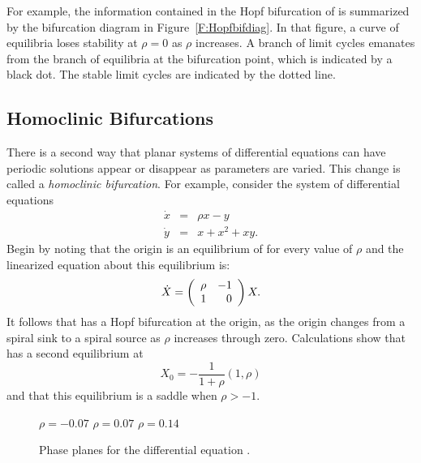 For example, the information contained in the Hopf bifurcation of 
 is summarized by the bifurcation diagram in 
Figure~\ref{F:Hopfbifdiag}.
In that figure, a curve of equilibria  
loses stability at $\rho=0$ as $\rho$ increases.  A branch of limit 
cycles emanates from the
branch of equilibria at the bifurcation point, which is indicated by a 
black dot.  The stable limit cycles are indicated by the dotted line.



\subsection*{Homoclinic Bifurcations}

There is a second way that planar systems of differential equations 
can have periodic solutions appear or disappear as parameters are varied.  
This  change is called a {\em homoclinic bifurcation\/}.  For example,
consider the system of differential equations
\begin{equation*}  \label{E:homobif}
\begin{array}{rcl} 
\dot{x} & = & \rho x - y \\
\dot{y} & = &  x + x^2 + xy.
\end{array}
\end{equation*}
Begin by noting that the origin is an equilibrium of 
for every value of $\rho$ and the linearized equation about this equilibrium 
is:
\[
\dot{X} = \left(\begin{array}{rr} \rho & -1\\ 1 &0\end{array}\right)X.
\]
It follows that  has a Hopf bifurcation at the origin, as 
the origin changes from a spiral sink to a spiral source as $\rho$ 
increases through zero.  Calculations show that  has a 
second equilibrium at 
\[
X_0 = -\frac{1}{1+\rho}(1,\rho)
\]
and that this equilibrium is a saddle when $\rho>-1$.

\begin{figure}[htb]
           \centerline{%
           }
		\vspace*{-0.2in}		
	$\rho=-0.07$ \hspace{1.8in} $\rho=0.07$ 
		\hspace{1.8in} $\rho=0.14$
	  \caption{Phase planes for the differential equation 
	\protect{}. }
           \label{F:homobif}
\end{figure}

